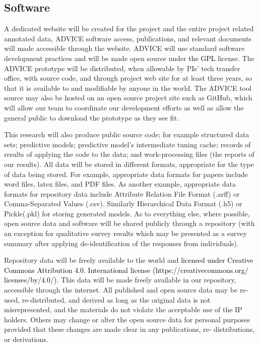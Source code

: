 \subsection{Software}
A dedicated website will be created for the project and the entire project related annotated data, ADVICE software access, publications, and relevant documents will made accessible through the website. ADVICE  will use standard software development practices and will be made open source under \textcolor{black}{the GPL} license. The ADVICE prototype will be distributed, when allowable by PIs' tech transfer office, with source code, and through project web site for at least three years, so that it is available to and modifiable by anyone in the world. The ADVICE tool source may also be hosted on an open source project site such as GitHub, which will allow our team to coordinate our development efforts as well as allow the general public to download the prototype as they see fit. 

This research will also produce public source code; for example  structured data sets; predictive models; predictive model's intermediate tuning cache; records of results of applying the code to the data;  and work-processing files (the reports of our results). 
All data will be stored in different formats, appropriate for the type of data being stored. For example, appropriate data formats for papers include word files, latex files, and PDF files. As another example, appropriate data formats for repository data include Attribute Relation File Format (.arff) or Comma-Separated Values (.csv). Similarly Hierarchical Data Format (.h5) or Pickle(.pkl) for storing generated models. As to everything else,
where possible, open source data and software will be shared publicly through a repository (with an exception for qualitative survey results which may be presented as a survey summary after applying de-identification of the responses from individuals). 

Repository data will be freely available to the world and \textcolor{black}{licensed under Creative Commons Attribution 4.0. International license (https://creativecommons.org/ licenses/by/4.0/).} This data will be made freely available in our repository, accessible through the internet.  All published and open source data may be re-used, re-distributed, and derived as long as the original data is not misrepresented, and the materials do not violate the acceptable use of the IP holders. Others may change or alter the open source data for personal purposes provided that these changes are made clear in any publications, re- distributions, or derivations. 

